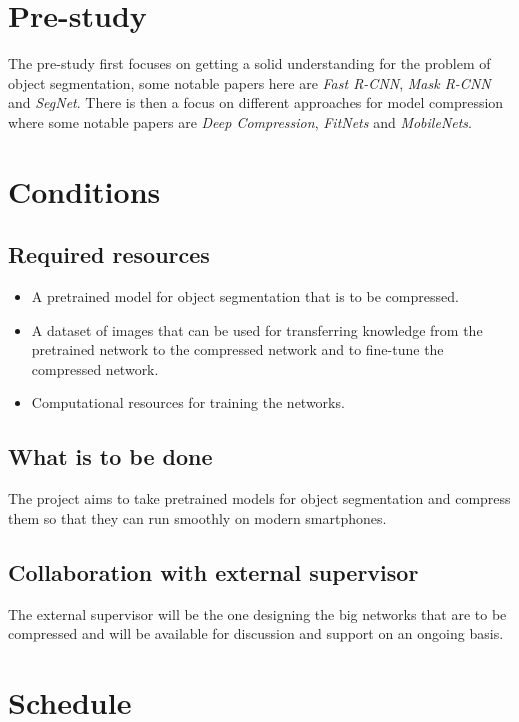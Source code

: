 \documentclass[11pt]{article}
\newcommand{\bibentry}[1]{\cite{#1}}
\begin{document}
\section{Pre-study}
\label{sec:orgb928101}
The pre-study first focuses on getting a solid understanding for the problem of object segmentation, some notable papers here are \emph{Fast R-CNN}\bibentry{girshick2015fast}, \emph{Mask R-CNN}\bibentry{he2017mask} and \emph{SegNet}\bibentry{badrinarayanan2015segnet}.
There is then a focus on different approaches for model compression where some notable papers are \emph{Deep Compression}\bibentry{han2015deep}, \emph{FitNets}\bibentry{romero2014fitnets} and \emph{MobileNets}\bibentry{howard2017mobilenets}. 

\section{Conditions}
\label{sec:org7706971}
\subsection{Required resources}
\label{sec:org86c51dc}
\begin{itemize}
\item A pretrained model for object segmentation that is to be compressed.
\item A dataset of images that can be used for transferring knowledge from the pretrained network to the compressed network and to fine-tune the compressed network.
\item Computational resources for training the networks.
\end{itemize}
\subsection{What is to be done}
\label{sec:org7f53bfd}
The project aims to take pretrained models for object segmentation and compress them so that they can run smoothly on modern smartphones.
\subsection{Collaboration with external supervisor}
\label{sec:org1c53199}
The external supervisor will be the one designing the big networks that are to be compressed and will be available for discussion and support on an ongoing basis.
\section{Schedule}
\label{sec:org3204097}
\end{document}
